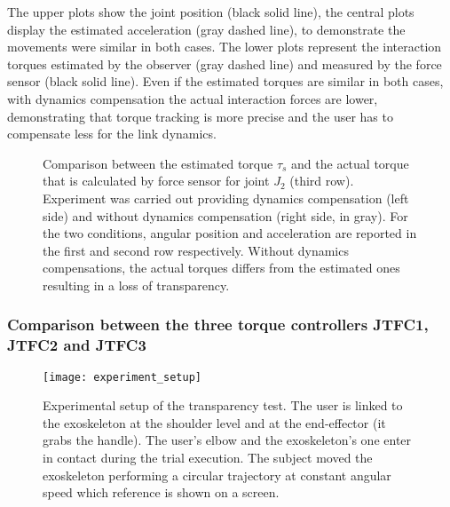 \par The upper plots show the joint position (black solid line), the central plots display the estimated acceleration (gray dashed line), to demonstrate the movements were similar in both cases. The lower plots represent the interaction torques estimated by the observer (gray dashed line) and measured by the force sensor (black solid line). Even if the estimated torques are similar in both cases, with dynamics compensation the actual interaction forces are lower, demonstrating that torque tracking is more precise and the user has to compensate less for the link dynamics.


\begin{figure*}[htb]
	\centering
	\def\svgwidth{2\columnwidth}
	\begin{footnotesize}
		
	\end{footnotesize}
	\caption{Comparison between the estimated torque $\tau_s$ and the actual torque that is calculated by force sensor for joint $J_2$ (third row). Experiment was carried out providing dynamics compensation (left side) and without dynamics compensation (right side, in gray). For the two conditions, angular position and acceleration are reported in the first and second row respectively. Without dynamics compensations, the actual torques differs from the estimated ones resulting in a loss of transparency. }
	\label{fig:torque_validation}
\end{figure*}

\subsubsection{Comparison between the three torque controllers JTFC1, JTFC2 and JTFC3}

\begin{figure}[htb]
	\centering
	\texttt{[image: experiment\_setup]}
	\caption{Experimental setup of the transparency test. The user is linked to the exoskeleton at the shoulder level and at the end-effector (it grabs the handle).  The user's elbow and the exoskeleton's one enter in contact during the trial execution. The subject moved the exoskeleton performing a circular trajectory at constant angular speed which reference is shown on a screen.}
	\label{fig:experimentalSetup}
\end{figure}

